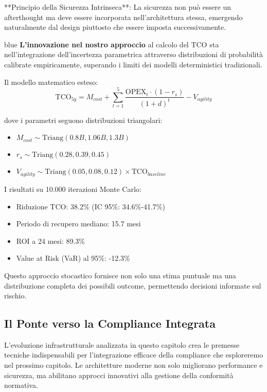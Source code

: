 \documentclass[12pt,a4paper,twoside]{book}
\begin{document}
**Principio della Sicurezza Intrinseca**: La sicurezza non può essere un afterthought ma deve essere incorporata nell'architettura stessa, emergendo naturalmente dal design piuttosto che essere imposta successivamente.

\begin{innovationbox}{blue}
\textbf{L'innovazione nel nostro approccio} al calcolo del TCO sta nell'integrazione dell'incertezza parametrica attraverso distribuzioni di probabilità calibrate empiricamente, superando i limiti dei modelli deterministici tradizionali.

Il modello matematico esteso:
$$\text{TCO}_{5y} = M_{cost} + \sum_{t=1}^{5} \frac{\text{OPEX}_t \cdot (1-r_s)}{(1+d)^t} - V_{agility}$$

dove i parametri seguono distribuzioni triangolari:
\begin{itemize}
\item $M_{cost} \sim \text{Triang}(0.8B, 1.06B, 1.3B)$
\item $r_s \sim \text{Triang}(0.28, 0.39, 0.45)$
\item $V_{agility} \sim \text{Triang}(0.05, 0.08, 0.12) \times \text{TCO}_{baseline}$
\end{itemize}

I risultati su 10.000 iterazioni Monte Carlo:
\begin{itemize}
\item Riduzione TCO: 38.2\% (IC 95\%: 34.6\%-41.7\%)
\item Periodo di recupero mediano: 15.7 mesi
\item ROI a 24 mesi: 89.3\%
\item Value at Risk (VaR) al 95\%: -12.3\%
\end{itemize}

Questo approccio stocastico fornisce non solo una stima puntuale ma una distribuzione completa dei possibili outcome, permettendo decisioni informate sul rischio.
\end{innovationbox}

\subsection{Il Ponte verso la Compliance Integrata}

L'evoluzione infrastrutturale analizzata in questo capitolo crea le premesse tecniche indispensabili per l'integrazione efficace della compliance che esploreremo nel prossimo capitolo. Le architetture moderne non solo migliorano performance e sicurezza, ma abilitano approcci innovativi alla gestione della conformità normativa.
\end{document}
